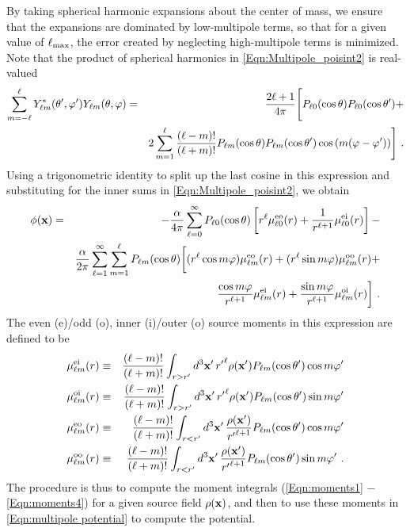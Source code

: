 By taking spherical harmonic expansions about the center of mass, we
ensure that the expansions are dominated by low-multipole terms, so
that for a given value of $\ell_{\rm max}$, the error created by
neglecting high-multipole terms is minimized.
Note that the product of spherical harmonics in \eqref{Eqn:Multipole_poisint2} is
real-valued
\begin{eqnarray}
\sum_{m=-\ell}^\ell Y_{\ell m}^*(\theta',\varphi') Y_{\ell m}(\theta,\varphi)&=&
  {2\ell+1\over 4\pi} \Biggl[ P_{\ell 0}(\cos\theta) P_{\ell 0}(\cos\theta') +
  \\
\nonumber
  &&
  2\sum_{m=1}^\ell {(\ell-m)!\over (\ell+m)!}
  P_{\ell m}(\cos\theta)P_{\ell m}(\cos\theta')
  \cos\left(m(\varphi-\varphi')\right)
  \Biggr]\ .
\end{eqnarray}
Using a trigonometric identity to split up the last cosine in this expression
and substituting for the inner sums in \eqref{Eqn:Multipole_poisint2},
we obtain
\begin{eqnarray}
\label{Eqn:multipole potential}
\nonumber
\phi({\bf x}) &=& -{\alpha\over 4\pi}
                   \sum_{\ell=0}^\infty P_{\ell 0}(\cos\theta)\left[
  r^\ell \mu^{\rm eo}_{\ell 0}(r) +
  {1\over r^{\ell+1}} \mu^{\rm ei}_{\ell 0}(r) \right] - \\
  &&
  {\alpha\over 2\pi}
  \sum_{\ell=1}^\infty \sum_{m=1}^\ell P_{\ell m}(\cos\theta)\biggl[
  (r^\ell \cos m\varphi) \mu^{\rm eo}_{\ell m}(r) +
  (r^\ell \sin m\varphi) \mu^{\rm oo}_{\ell m}(r) + \\
\nonumber
  &&\qquad\qquad\qquad\qquad\qquad
  {\cos m\varphi\over r^{\ell+1}} \mu^{\rm ei}_{\ell m}(r) +
  {\sin m\varphi\over r^{\ell+1}} \mu^{\rm oi}_{\ell m}(r) \biggr]\ .
\end{eqnarray}
The even (e)/odd (o), inner (i)/outer (o) source moments in this expression are
defined to be
\begin{eqnarray}
\label{Eqn:moments1}
\mu^{\rm ei}_{\ell m}(r) &\equiv&
  {(\ell-m)!\over (\ell+m)!} \int_{r>r'} d^3{\bf x}'\,
  {r'}^\ell \rho({\bf x}') P_{\ell m}(\cos\theta') \cos m\varphi' \\
\mu^{\rm oi}_{\ell m}(r) &\equiv&
  {(\ell-m)!\over (\ell+m)!} \int_{r>r'} d^3{\bf x}'\,
  {r'}^\ell \rho({\bf x}') P_{\ell m}(\cos\theta') \sin m\varphi' \\
\mu^{\rm eo}_{\ell m}(r) &\equiv&
  {(\ell-m)!\over (\ell+m)!} \int_{r<r'} d^3{\bf x}'\,
  {\rho({\bf x}')\over {r'}^{\ell+1}} P_{\ell m}(\cos\theta') \cos m\varphi'
  \\
\label{Eqn:moments4}
\mu^{\rm oo}_{\ell m}(r) &\equiv&
  {(\ell-m)!\over (\ell+m)!} \int_{r<r'} d^3{\bf x}'\,
  {\rho({\bf x}')\over {r'}^{\ell+1}} P_{\ell m}(\cos\theta') \sin m\varphi'
  \ .
\end{eqnarray}
The procedure is thus to compute the moment integrals 
(\eqref{Eqn:moments1} $-$ \eqref{Eqn:moments4})
for a given source field $\rho({\bf x})$, and then to use these moments
in \eqref{Eqn:multipole potential} to compute the
potential.

